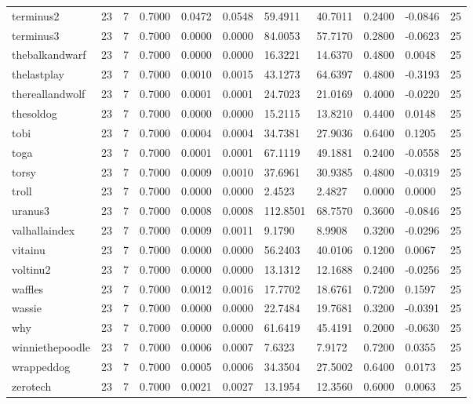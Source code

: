 \begin{table}[htbp]
\begin{tabular}{lllllllllll}
terminus2 & 23 & 7 & 0.7000 & 0.0472 & 0.0548 & 59.4911 & 40.7011 & 0.2400 & -0.0846 & 25 \\
terminus3 & 23 & 7 & 0.7000 & 0.0000 & 0.0000 & 84.0053 & 57.7170 & 0.2800 & -0.0623 & 25 \\
thebalkandwarf & 23 & 7 & 0.7000 & 0.0000 & 0.0000 & 16.3221 & 14.6370 & 0.4800 & 0.0048 & 25 \\
thelastplay & 23 & 7 & 0.7000 & 0.0010 & 0.0015 & 43.1273 & 64.6397 & 0.4800 & -0.3193 & 25 \\
thereallandwolf & 23 & 7 & 0.7000 & 0.0001 & 0.0001 & 24.7023 & 21.0169 & 0.4000 & -0.0220 & 25 \\
thesoldog & 23 & 7 & 0.7000 & 0.0000 & 0.0000 & 15.2115 & 13.8210 & 0.4400 & 0.0148 & 25 \\
tobi & 23 & 7 & 0.7000 & 0.0004 & 0.0004 & 34.7381 & 27.9036 & 0.6400 & 0.1205 & 25 \\
toga & 23 & 7 & 0.7000 & 0.0001 & 0.0001 & 67.1119 & 49.1881 & 0.2400 & -0.0558 & 25 \\
torsy & 23 & 7 & 0.7000 & 0.0009 & 0.0010 & 37.6961 & 30.9385 & 0.4800 & -0.0319 & 25 \\
troll & 23 & 7 & 0.7000 & 0.0000 & 0.0000 & 2.4523 & 2.4827 & 0.0000 & 0.0000 & 25 \\
uranus3 & 23 & 7 & 0.7000 & 0.0008 & 0.0008 & 112.8501 & 68.7570 & 0.3600 & -0.0846 & 25 \\
valhallaindex & 23 & 7 & 0.7000 & 0.0009 & 0.0011 & 9.1790 & 8.9908 & 0.3200 & -0.0296 & 25 \\
vitainu & 23 & 7 & 0.7000 & 0.0000 & 0.0000 & 56.2403 & 40.0106 & 0.1200 & 0.0067 & 25 \\
voltinu2 & 23 & 7 & 0.7000 & 0.0000 & 0.0000 & 13.1312 & 12.1688 & 0.2400 & -0.0256 & 25 \\
waffles & 23 & 7 & 0.7000 & 0.0012 & 0.0016 & 17.7702 & 18.6761 & 0.7200 & 0.1597 & 25 \\
wassie & 23 & 7 & 0.7000 & 0.0000 & 0.0000 & 22.7484 & 19.7681 & 0.3200 & -0.0391 & 25 \\
why & 23 & 7 & 0.7000 & 0.0000 & 0.0000 & 61.6419 & 45.4191 & 0.2000 & -0.0630 & 25 \\
winniethepoodle & 23 & 7 & 0.7000 & 0.0006 & 0.0007 & 7.6323 & 7.9172 & 0.7200 & 0.0355 & 25 \\
wrappeddog & 23 & 7 & 0.7000 & 0.0005 & 0.0006 & 34.3504 & 27.5002 & 0.6400 & 0.0173 & 25 \\
zerotech & 23 & 7 & 0.7000 & 0.0021 & 0.0027 & 13.1954 & 12.3560 & 0.6000 & 0.0063 & 25 \\

\end{tabular}
\end{table}
